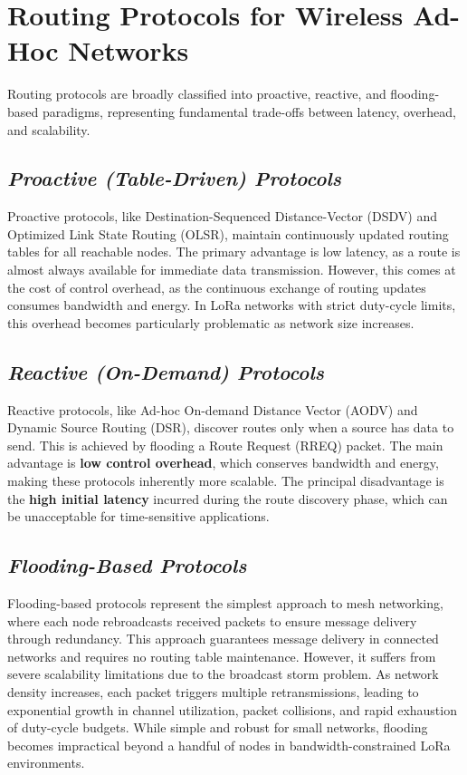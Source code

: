 \section{Routing Protocols for Wireless Ad-Hoc Networks}

Routing protocols are broadly classified into proactive, reactive, and flooding-based paradigms, representing fundamental trade-offs between latency, overhead, and scalability.

\subsection{\textit{Proactive (Table-Driven) Protocols}}

Proactive protocols, like Destination-Sequenced Distance-Vector (DSDV) and Optimized Link State Routing (OLSR), maintain continuously updated routing tables for all reachable nodes. The primary advantage is low latency, as a route is almost always available for immediate data transmission. However, this comes at the cost of control overhead, as the continuous exchange of routing updates consumes bandwidth and energy. In LoRa networks with strict duty-cycle limits, this overhead becomes particularly problematic as network size increases.

\subsection{\textit{Reactive (On-Demand) Protocols}}

Reactive protocols, like Ad-hoc On-demand Distance Vector (AODV) and Dynamic Source Routing (DSR), discover routes only when a source has data to send. This is achieved by flooding a Route Request (RREQ) packet. The main advantage is \textbf{low control overhead}, which conserves bandwidth and energy, making these protocols inherently more scalable. The principal disadvantage is the \textbf{high initial latency} incurred during the route discovery phase, which can be unacceptable for time-sensitive applications.

\subsection{\textit{Flooding-Based Protocols}}

Flooding-based protocols represent the simplest approach to mesh networking, where each node rebroadcasts received packets to ensure message delivery through redundancy. This approach guarantees message delivery in connected networks and requires no routing table maintenance. However, it suffers from severe scalability limitations due to the broadcast storm problem. As network density increases, each packet triggers multiple retransmissions, leading to exponential growth in channel utilization, packet collisions, and rapid exhaustion of duty-cycle budgets. While simple and robust for small networks, flooding becomes impractical beyond a handful of nodes in bandwidth-constrained LoRa environments.

